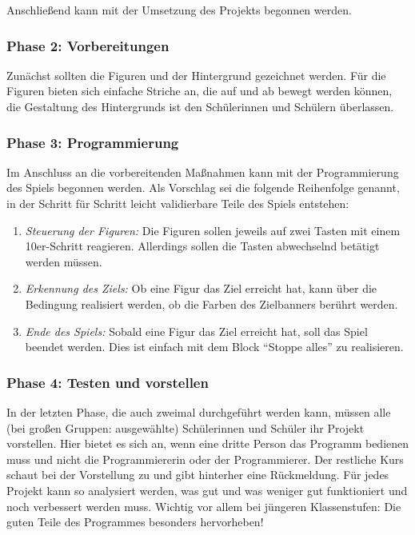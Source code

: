 Anschließend kann mit der Umsetzung des Projekts begonnen werden.

\subsubsection{Phase 2: Vorbereitungen}\label{phase-2-vorbereitungen}

Zunächst sollten die Figuren und der Hintergrund gezeichnet werden. Für
die Figuren bieten sich einfache Striche an, die auf und ab bewegt
werden können, die Gestaltung des Hintergrunds ist den Schülerinnen und
Schülern überlassen.

\subsubsection{Phase 3: Programmierung}\label{phase-3-programmierung}

Im Anschluss an die vorbereitenden Maßnahmen kann mit der Programmierung
des Spiels begonnen werden. Als Vorschlag sei die folgende Reihenfolge
genannt, in der Schritt für Schritt leicht validierbare Teile des Spiels
entstehen:

\begin{enumerate}
\item
  \emph{Steuerung der Figuren:} Die Figuren sollen jeweils auf zwei
  Tasten mit einem 10er-Schritt reagieren. Allerdings sollen die Tasten
  abwechselnd betätigt werden müssen.
\item
  \emph{Erkennung des Ziels:} Ob eine Figur das Ziel erreicht hat, kann
  über die Bedingung realisiert werden, ob die Farben des Zielbanners
  berührt werden.
\item
  \emph{Ende des Spiels:} Sobald eine Figur das Ziel erreicht hat, soll
  das Spiel beendet werden. Dies ist einfach mit dem Block ``Stoppe
  alles'' zu realisieren.
\end{enumerate}

\subsubsection{Phase 4: Testen und
vorstellen}\label{phase-4-testen-und-vorstellen}

In der letzten Phase, die auch zweimal durchgeführt werden kann, müssen
alle (bei großen Gruppen: ausgewählte) Schülerinnen und Schüler ihr
Projekt vorstellen. Hier bietet es sich an, wenn eine dritte Person das
Programm bedienen muss und nicht die Programmiererin oder der
Programmierer. Der restliche Kurs schaut bei der Vorstellung zu und gibt
hinterher eine Rückmeldung. Für jedes Projekt kann so analysiert werden,
was gut und was weniger gut funktioniert und noch verbessert werden
muss. Wichtig vor allem bei jüngeren Klassenstufen: Die guten Teile des
Programmes besonders hervorheben!

